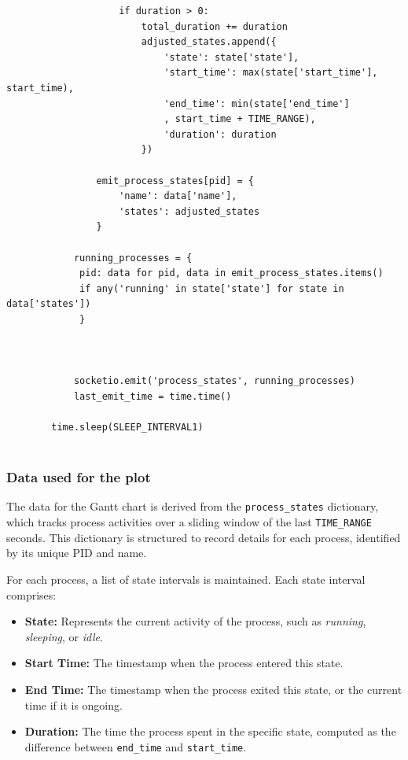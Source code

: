 \documentclass[12pt]{article}
\begin{document}
\begin{verbatim}
                    if duration > 0:
                        total_duration += duration
                        adjusted_states.append({
                            'state': state['state'],
                            'start_time': max(state['start_time'], start_time),
                            'end_time': min(state['end_time']
                            , start_time + TIME_RANGE),
                            'duration': duration
                        })
                                
                emit_process_states[pid] = {
                    'name': data['name'],
                    'states': adjusted_states
                }

            running_processes = {
             pid: data for pid, data in emit_process_states.items()
             if any('running' in state['state'] for state in data['states'])
             }   


            
            socketio.emit('process_states', running_processes)  
            last_emit_time = time.time() 

        time.sleep(SLEEP_INTERVAL1)  


\end{verbatim}

\subsubsection{Data used for the plot}
The data for the Gantt chart is derived from the \texttt{process\_states} dictionary, which tracks process activities over a sliding window of the last \texttt{TIME\_RANGE} seconds. This dictionary is structured to record details for each process, identified by its unique PID and name. 

For each process, a list of state intervals is maintained. Each state interval comprises:
\begin{itemize}
    \item \textbf{State:} Represents the current activity of the process, such as \textit{running}, \textit{sleeping}, or \textit{idle}.
    \item \textbf{Start Time:} The timestamp when the process entered this state.
    \item \textbf{End Time:} The timestamp when the process exited this state, or the current time if it is ongoing.
    \item \textbf{Duration:} The time the process spent in the specific state, computed as the difference between \texttt{end\_time} and \texttt{start\_time}.
\end{itemize}
\end{document}
